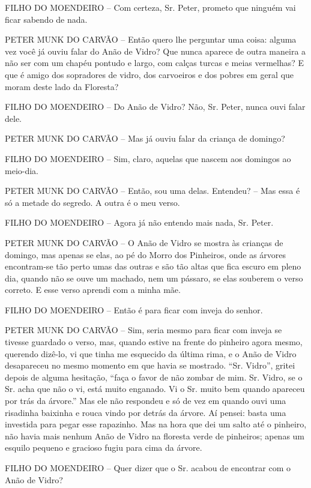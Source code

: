 FILHO DO MOENDEIRO -- Com certeza, Sr. Peter, prometo que ninguém vai
ficar sabendo de nada.

PETER MUNK DO CARVÃO -- Então quero lhe perguntar uma coisa: alguma vez
você já ouviu falar do Anão de Vidro? Que nunca aparece de outra maneira
a não ser com um chapéu pontudo e largo, com calças turcas e meias
vermelhas? E que é amigo dos sopradores de vidro, dos carvoeiros e dos
pobres em geral que moram deste lado da Floresta?

FILHO DO MOENDEIRO -- Do Anão de Vidro? Não, Sr. Peter, nunca ouvi falar
dele.

PETER MUNK DO CARVÃO -- Mas já ouviu falar da criança de domingo?

FILHO DO MOENDEIRO -- Sim, claro, aquelas que nascem aos domingos ao
meio-dia.

PETER MUNK DO CARVÃO -- Então, sou uma delas. Entendeu? -- Mas essa é só
a metade do segredo. A outra é o meu verso.

FILHO DO MOENDEIRO -- Agora já não entendo mais nada, Sr. Peter.

PETER MUNK DO CARVÃO -- O Anão de Vidro se mostra às crianças de
domingo, mas apenas se elas, ao pé do Morro dos Pinheiros, onde as
árvores encontram-se tão perto umas das outras e são tão altas que fica
escuro em pleno dia, quando não se ouve um machado, nem um pássaro, se
elas souberem o verso correto. E esse verso aprendi com a minha mãe.

FILHO DO MOENDEIRO -- Então é para ficar com inveja do senhor.

PETER MUNK DO CARVÃO -- Sim, seria mesmo para ficar com inveja se
tivesse guardado o verso, mas, quando estive na frente do pinheiro agora
mesmo, querendo dizê-lo, vi que tinha me esquecido da última rima, e o
Anão de Vidro desapareceu no mesmo momento em que havia se mostrado.
``Sr. Vidro'', gritei depois de alguma hesitação, ``faça o favor de não
zombar de mim. Sr. Vidro, se o Sr. acha que não o vi, está muito
enganado. Vi o Sr. muito bem quando apareceu por trás da árvore.'' Mas
ele não respondeu e só de vez em quando ouvi uma risadinha baixinha e
rouca vindo por detrás da árvore. Aí pensei: basta uma investida para
pegar esse rapazinho. Mas na hora que dei um salto até o pinheiro, não
havia mais nenhum Anão de Vidro na floresta verde de pinheiros; apenas
um esquilo pequeno e gracioso fugiu para cima da árvore.

FILHO DO MOENDEIRO -- Quer dizer que o Sr. acabou de encontrar com o
Anão de Vidro?


